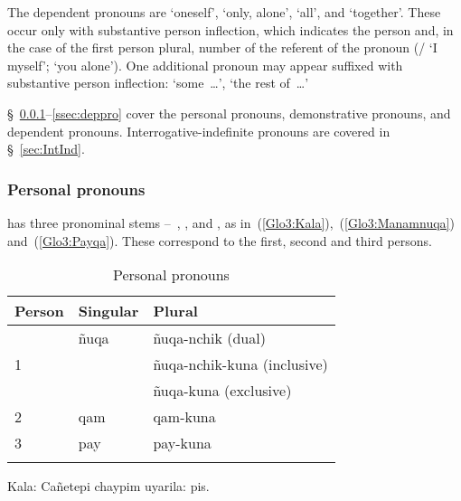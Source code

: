 The dependent pronouns are  ‘oneself’,  ‘only, alone’,  ‘all’, and  ‘together’. These occur only with substantive person inflection, which indicates the person and, in the case of the first person plural, number of the referent of the pronoun (/\phono{-:} ‘I myself’;  ‘you alone’). One additional pronoun may appear suffixed with substantive person inflection:  ‘some~\dots’, ‘the rest of~\dots’

§~\ref{ssec:ppnqp}--\ref{ssec:deppro} cover the personal pronouns, demonstrative pronouns, and dependent pronouns. Interrogative-indefinite pronouns are covered in §~\ref{sec:IntInd}.

\subsubsection{Personal pronouns }\label{ssec:ppnqp}
\SYQ{} has three pronominal stems --~, , and , as in~(\ref{Glo3:Kala}),~(\ref{Glo3:Manamnuqa}) and~(\ref{Glo3:Payqa}). These correspond to the first, second and third persons.

\begin{table}[!ht]
\small\centering
\caption{Personal pronouns}\label{Tab8}
\begin{tabular}{lll}
\lsptoprule
Person & Singular & Plural\\
\midrule
\multirow{3}{*}{1} 	& ñuqa 	& ñuqa-nchik (dual)		\\
	& 			& ñuqa-nchik-kuna (inclusive)	\\
	& 			& ñuqa-kuna (exclusive)	\\
2 	& qam 		& qam-kuna			\\
3 	& pay 		& pay-kuna\\
\lspbottomrule
\end{tabular}
\end{table}

%
{Kala: Cañetepi chaypim uyarila: pis.}%
{}%
{}{}%

